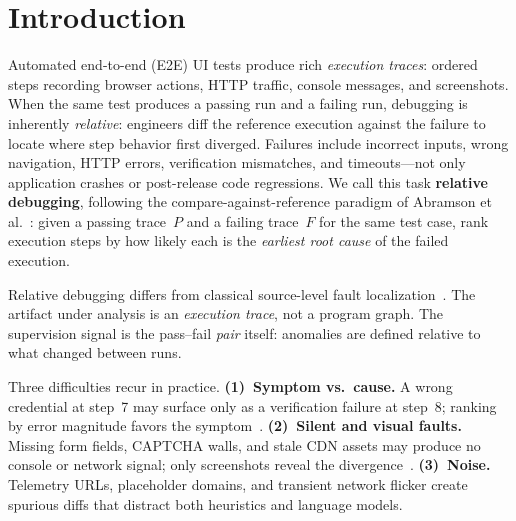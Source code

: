\documentclass[sigconf,nonacm]{acmart}
\begin{document}
\makeatletter
{}
\pagestyle{standardpagestyle}
\makeatother

\section{Introduction}
\label{sec:intro}

Automated end-to-end (E2E) UI tests produce rich \emph{execution traces}: ordered steps recording browser actions, HTTP traffic, console messages, and screenshots.
When the same test produces a passing run and a failing run, debugging is inherently \emph{relative}: engineers diff the reference execution against the failure to locate where step behavior first diverged.
Failures include incorrect inputs, wrong navigation, HTTP errors, verification mismatches, and timeouts---not only application crashes or post-release code regressions.
We call this task \textbf{relative debugging}, following the compare-against-reference paradigm of Abramson et al.~\cite{abramson1996relative,abramson1995sc,sosic1997guard}: given a passing trace~$P$ and a failing trace~$F$ for the same test case, rank execution steps by how likely each is the \emph{earliest root cause} of the failed execution.

Relative debugging differs from classical source-level fault localization~\cite{wong2016survey,agrawal1995fault}.
The artifact under analysis is an \emph{execution trace}, not a program graph.
The supervision signal is the pass--fail \emph{pair} itself: anomalies are defined relative to what changed between runs.

Three difficulties recur in practice.
\textbf{(1)~Symptom vs.\ cause.}
A wrong credential at step~7 may surface only as a verification failure at step~8; ranking by error magnitude favors the symptom~\cite{jones2002visualization}.
\textbf{(2)~Silent and visual faults.}
Missing form fields, CAPTCHA walls, and stale CDN assets may produce no console or network signal; only screenshots reveal the divergence~\cite{mesbah2012crawling}.
\textbf{(3)~Noise.}
Telemetry URLs, placeholder domains, and transient network flicker create spurious diffs that distract both heuristics and language models.
\end{document}
